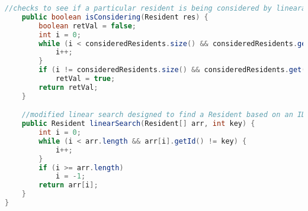 \documentclass[letterpaper, 10pt,DIV=13]{scrartcl}
\numberwithin{equation}{section} %
\numberwithin{figure}{section} %
\numberwithin{table}{section} %
\begin{document}
\begin{lstlisting}[frame=single, language=java, breaklines]
    //checks to see if a particular resident is being considered by linearaly searching the consideredResidents list
    public boolean isConsidering(Resident res) {
        boolean retVal = false;
        int i = 0;
        while (i < consideredResidents.size() && consideredResidents.get(i) != res) {
            i++;
        }
        if (i != consideredResidents.size() && consideredResidents.get(i) == res) 
            retVal = true;
        return retVal;
    }

    //modified linear search designed to find a Resident based on an ID, and return the object itself
    public Resident linearSearch(Resident[] arr, int key) {
        int i = 0;
        while (i < arr.length && arr[i].getId() != key) {
            i++;
        }
        if (i >= arr.length)
            i = -1;
        return arr[i];
    }
}
\end{lstlisting}
\end{document}
